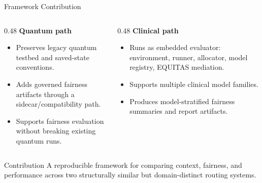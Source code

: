 \documentclass[aspectratio=169,10pt]{beamer}
\begin{document}
\begin{frame}{Framework Contribution}
\begin{columns}[T]
\begin{column}{0.48\textwidth}
\textbf{Quantum path}
\begin{itemize}
    \item Preserves legacy quantum testbed and saved-state conventions.
    \item Adds governed fairness artifacts through a sidecar/compatibility path.
    \item Supports fairness evaluation without breaking existing quantum runs.
\end{itemize}
\end{column}
\begin{column}{0.48\textwidth}
\textbf{Clinical path}
\begin{itemize}
    \item Runs as embedded evaluator: environment, runner, allocator, model registry, EQUITAS mediation.
    \item Supports multiple clinical model families.
    \item Produces model-stratified fairness summaries and report artifacts.
\end{itemize}
\end{column}
\end{columns}

\vspace{0.7em}
\begin{block}{Contribution}
A reproducible framework for comparing context, fairness, and performance across two structurally similar but domain-distinct routing systems.
\end{block}
\end{frame}
\end{document}
